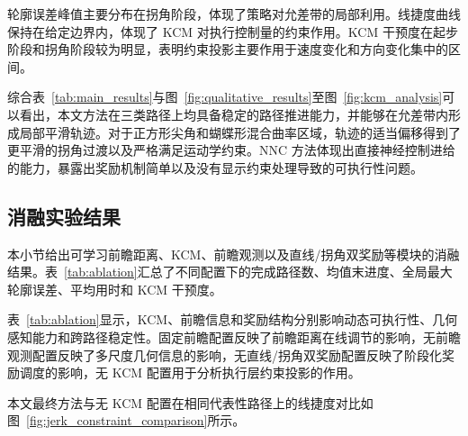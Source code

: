 \documentclass[preprint,12pt]{elsarticle}
\begin{document}
轮廓误差峰值主要分布在拐角阶段，体现了策略对允差带的局部利用。线捷度曲线保持在给定边界内，体现了 KCM 对执行控制量的约束作用。KCM 干预度在起步阶段和拐角阶段较为明显，表明约束投影主要作用于速度变化和方向变化集中的区间。

综合表~\ref{tab:main_results}与图~\ref{fig:qualitative_results}至图~\ref{fig:kcm_analysis}可以看出，本文方法在三类路径上均具备稳定的路径推进能力，并能够在允差带内形成局部平滑轨迹。对于正方形尖角和蝴蝶形混合曲率区域，轨迹的适当偏移得到了更平滑的拐角过渡以及严格满足运动学约束。NNC 方法体现出直接神经控制进给的能力，暴露出奖励机制简单以及没有显示约束处理导致的可执行性问题。

\subsection{消融实验结果}

本小节给出可学习前瞻距离、KCM、前瞻观测以及直线/拐角双奖励等模块的消融结果。表~\ref{tab:ablation}汇总了不同配置下的完成路径数、均值末进度、全局最大轮廓误差、平均用时和 KCM 干预度。


表~\ref{tab:ablation}显示，KCM、前瞻信息和奖励结构分别影响动态可执行性、几何感知能力和跨路径稳定性。固定前瞻配置反映了前瞻距离在线调节的影响，无前瞻观测配置反映了多尺度几何信息的影响，无直线/拐角双奖励配置反映了阶段化奖励调度的影响，无 KCM 配置用于分析执行层约束投影的作用。

本文最终方法与无 KCM 配置在相同代表性路径上的线捷度对比如图~\ref{fig:jerk_constraint_comparison}所示。
\end{document}
